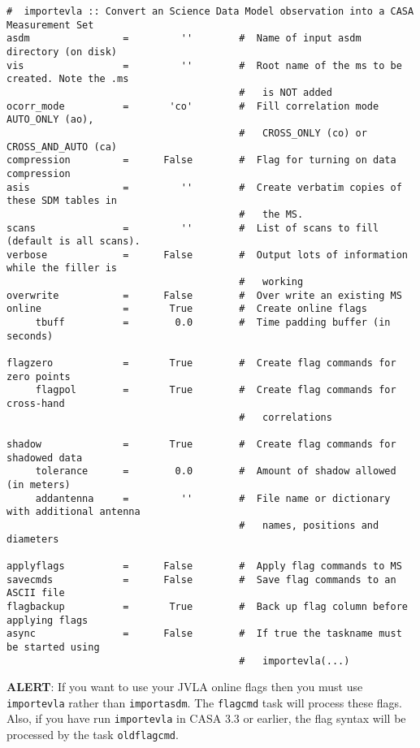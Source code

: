 \small
\begin{verbatim}
#  importevla :: Convert an Science Data Model observation into a CASA Measurement Set
asdm                =         ''        #  Name of input asdm directory (on disk)
vis                 =         ''        #  Root name of the ms to be created. Note the .ms
                                        #   is NOT added
ocorr_mode          =       'co'        #  Fill correlation mode AUTO_ONLY (ao),
                                        #   CROSS_ONLY (co) or CROSS_AND_AUTO (ca)
compression         =      False        #  Flag for turning on data compression
asis                =         ''        #  Create verbatim copies of these SDM tables in
                                        #   the MS.
scans               =         ''        #  List of scans to fill (default is all scans).
verbose             =      False        #  Output lots of information while the filler is
                                        #   working
overwrite           =      False        #  Over write an existing MS
online              =       True        #  Create online flags
     tbuff          =        0.0        #  Time padding buffer (in seconds)

flagzero            =       True        #  Create flag commands for zero points
     flagpol        =       True        #  Create flag commands for cross-hand
                                        #   correlations

shadow              =       True        #  Create flag commands for shadowed data
     tolerance      =        0.0        #  Amount of shadow allowed (in meters)
     addantenna     =         ''        #  File name or dictionary with additional antenna
                                        #   names, positions and diameters

applyflags          =      False        #  Apply flag commands to MS
savecmds            =      False        #  Save flag commands to an ASCII file
flagbackup          =       True        #  Back up flag column before applying flags
async               =      False        #  If true the taskname must be started using
                                        #   importevla(...)
\end{verbatim}
\normalsize

{\bf ALERT}: If you want to use your JVLA online flags then you must
use {\tt importevla} rather than {\tt importasdm}.  The {\tt flagcmd} 
task will process these flags. Also, if you have run {\tt importevla}
in CASA 3.3 or earlier, the flag syntax will be processed by the task
{\tt oldflagcmd}. 

